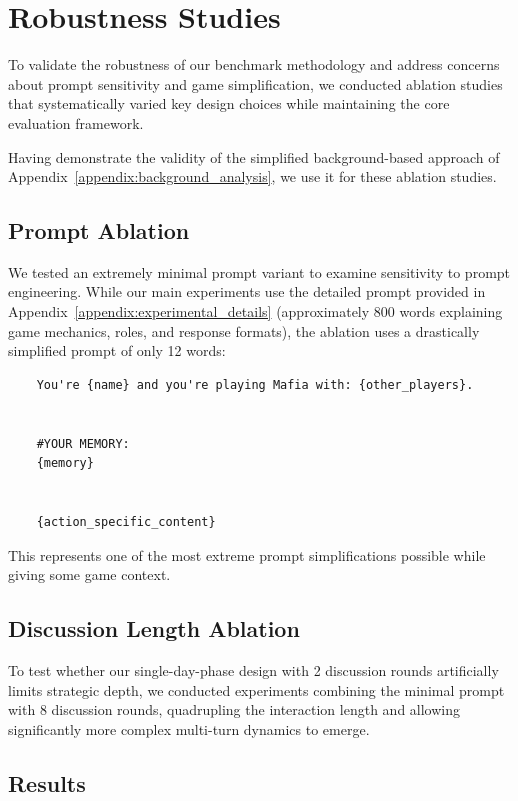 \documentclass{article}
\begin{document}
\section{Robustness Studies}
\label{appendix:ablation}

To validate the robustness of our benchmark methodology and address concerns about prompt sensitivity and game simplification, we conducted ablation studies that systematically varied key design choices while maintaining the core evaluation framework.

Having demonstrate the validity of the simplified background-based approach of Appendix~\ref{appendix:background_analysis}, we use it for these ablation studies.

\subsection{Prompt Ablation}

We tested an extremely minimal prompt variant to examine sensitivity to prompt engineering. While our main experiments use the detailed prompt provided in Appendix~\ref{appendix:experimental_details} (approximately 800 words explaining game mechanics, roles, and response formats), the ablation uses a drastically simplified prompt of only 12 words:

\begin{verbatim}
    You're {name} and you're playing Mafia with: {other_players}.


    #YOUR MEMORY:
    {memory}
    
    
    {action_specific_content}
\end{verbatim}

This represents one of the most extreme prompt simplifications possible while giving some game context.

\subsection{Discussion Length Ablation}

To test whether our single-day-phase design with 2 discussion rounds artificially limits strategic depth, we conducted experiments combining the minimal prompt with 8 discussion rounds, quadrupling the interaction length and allowing significantly more complex multi-turn dynamics to emerge.

\subsection{Results}
\end{document}
